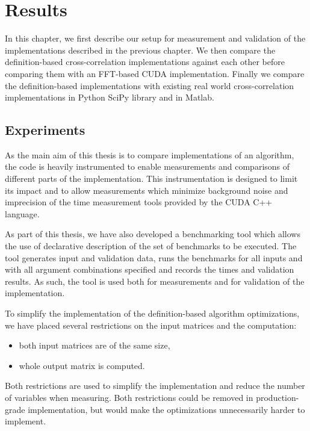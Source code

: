 \chapter{Results}
\label{sec:results}

In this chapter, we first describe our setup for measurement and validation of the implementations described in the previous chapter. We then compare the definition-based cross-correlation implementations against each other before comparing them with an FFT-based CUDA implementation. Finally we compare the definition-based implementations with existing real world cross-correlation implementations in Python SciPy library and in Matlab.

\section{Experiments}
As the main aim of this thesis is to compare implementations of an algorithm, the code is heavily instrumented to enable measurements and comparisons of different parts of the implementation. This instrumentation is designed to limit its impact and to allow measurements which minimize background noise and imprecision of the time measurement tools provided by the CUDA C++ language.

As part of this thesis, we have also developed a benchmarking tool which allows the use of declarative description of the set of benchmarks to be executed. The tool generates input and validation data, runs the benchmarks for all inputs and with all argument combinations specified and records the times and validation results. As such, the tool is used both for measurements and for validation of the implementation. 

To simplify the implementation of the definition-based algorithm optimizations, we have placed several restrictions on the input matrices and the computation:
\begin{itemize}
	\item both input matrices are of the same size,
	\item whole output matrix is computed.
\end{itemize}

Both restrictions are used to simplify the implementation and reduce the number of variables when measuring. Both restrictions could be removed in production-grade implementation, but would make the optimizations unnecessarily harder to implement. 


